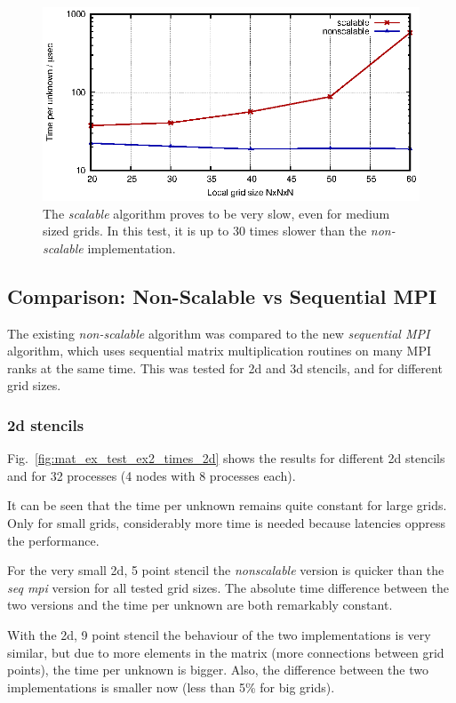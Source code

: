 \begin{figure}[tbp]
	\centering
	\includegraphics[width=1\textwidth]{scalable}
	\caption{The \textit{scalable} algorithm proves to be very slow, even for medium sized grids. In this test, it is up to 30 times slower than the \textit{non-scalable} implementation.} 
	\label{fig:scalable}
\end{figure}

\subsection{Comparison: Non-Scalable vs Sequential MPI}
The existing \textit{non-scalable} algorithm was compared to the new \textit{sequential MPI} algorithm, which uses sequential matrix multiplication routines on many MPI ranks at the same time. This was tested for 2d and 3d stencils, and for different grid sizes.

\subsubsection*{2d stencils}
Fig.~\ref{fig:mat_ex_test_ex2_times_2d} shows the results for different 2d stencils and for 32 processes (4 nodes with 8 processes each). 

It can be seen that the time per unknown remains quite constant for large grids. Only for small grids, considerably more time is needed because latencies oppress the performance.


For the very small 2d, 5 point stencil the \textit{nonscalable} version is quicker than the \textit{seq mpi} version for all tested grid sizes. The absolute time difference between the two versions and the time per unknown are both remarkably constant. 

With the 2d, 9 point stencil the behaviour of the two implementations is very similar, but due to more elements in the matrix (more connections between grid points), the time per unknown is bigger. Also, the difference between the two implementations is smaller now (less than 5\% for big grids). 

